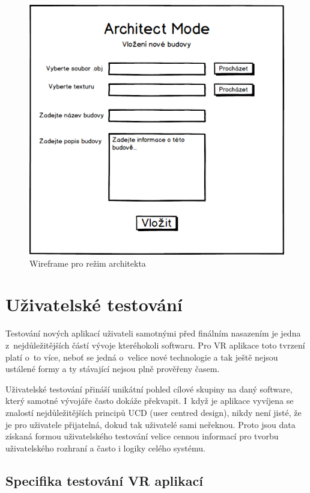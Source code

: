\documentclass[thesis=B,czech]{FITthesis}[2012/06/26]
\begin{document}
\begin{figure}
  		\includegraphics[width=\textwidth,height=\textheight,keepaspectratio]{ArchitectMock.png}
  		\caption{Wireframe pro režim architekta}
  		\label{fig:ArchitectMock}
	\end{figure}
	
	\section{Uživatelské testování}
	
	Testování nových aplikací uživateli samotnými před finálním nasazením je jedna z~nejdůležitějších částí vývoje kteréhokoli softwaru. Pro VR aplikace toto tvrzení platí o~to více, neboť se jedná o~velice nové technologie a tak ještě nejsou ustálené formy a ty stávající nejsou plně prověřeny časem.
	
	 Uživatelské testování přináší unikátní pohled cílové skupiny na daný software, který samotné vývojáře často dokáže překvapit. I~když je aplikace vyvíjena se znalostí nejdůležitějších principů UCD (user centred design), nikdy není jisté, že je pro uživatele přijatelná, dokud tak uživatelé sami neřeknou. Proto jsou data získaná formou uživatelského testování velice cennou informací pro tvorbu uživatelského rozhraní a často i logiky celého systému.
	
	\subsection{Specifika testování VR aplikací}
	
\end{document}
